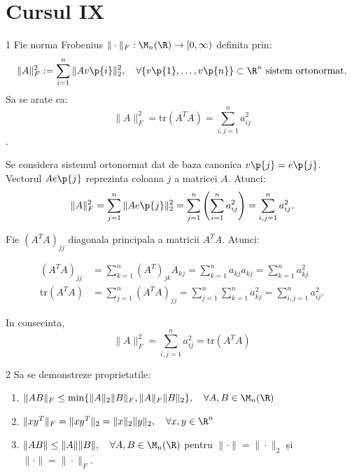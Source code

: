 
\section*{Cursul IX}

\begin{exercitiu}{1}
    Fie norma Frobenius $\|\cdot\|_F : \M_n(\R) \to [0, \infty)$ definita prin:
    $$ \|A\|_F^2 := \sum_{i=1}^n \|A v\p{i}\|_2^2, \quad \forall \{v\p{1}, \dots, v\p{n}\} \subset \R^n \text{ sistem ortonormat.} $$
    Sa se arate ca:
    $$ \|A\|_F^2 = \text{tr}(A^T A) = \sum_{i,j=1}^n a_{ij}^2 $$.
\end{exercitiu}

\begin{demonstratie}

    Se considera sistemul ortonormat dat de baza canonica $v\p{j} = e\p{j}$. Vectorul $A e\p{j}$ reprezinta coloana $j$ a matricei $A$. Atunci:
    $$
    \|A\|_F^2 = \sum_{j=1}^n \|A e\p{j}\|_2^2 = \sum_{j=1}^n \left( \sum_{i=1}^n a_{ij}^2 \right) = \sum_{i,j=1}^n a_{ij}^2.
    $$

    Fie $ (A^T A)_{jj} $ diagonala principala a matricii $ A^T A $. Atunci:


    \begin{align*}
    (A^T A)_{jj} &= \sum_{k=1}^n (A^T)_{jk} A_{kj} = \sum_{k=1}^n a_{kj} a_{kj} = \sum_{k=1}^n a_{kj}^2 \\
    \text{tr}(A^T A) &= \sum_{j=1}^n (A^T A)_{jj} = \sum_{j=1}^n \sum_{k=1}^n a_{kj}^2 = \sum_{i,j=1}^n a_{ij}^2.
    \end{align*}

    In consecinta,
    $$ \|A\|_F^2 = \sum_{i,j=1}^n a_{ij}^2 = \text{tr}(A^T A) $$

\end{demonstratie}

\begin{exercitiu}{2} Sa se demonstreze proprietatile:
\begin{enumerate}
    \item $\|AB\|_F \leq \min \{ \|A\|_2 \|B\|_F, \|A\|_F \|B\|_2 \}, \quad \forall A, B \in \M_n(\R)$
    \item $\|x y^T\|_F = \|x y^T\|_2 = \|x\|_2 \|y\|_2, \quad \forall x, y \in \R^n$
    \item $\|AB\| \leq \|A\| \|B\|, \quad \forall A, B \in \M_n(\R)$ pentru $\|\cdot\| = \|\cdot\|_2$ și $\|\cdot\| = \|\cdot\|_F$.
\end{enumerate}
\end{exercitiu}

